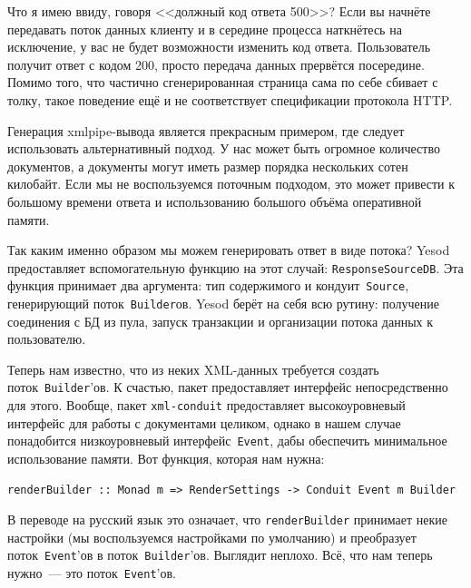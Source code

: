 \begin{remark}
    Что я имею ввиду, говоря <<должный код ответа 500>>? Если вы начнёте
    передавать поток данных клиенту и в середине процесса наткнётесь на
    исключение, у вас не будет возможности изменить код ответа. Пользователь
    получит ответ с кодом 200, просто передача данных прервётся посередине.
    Помимо того, что частично сгенерированная страница сама по себе сбивает с
    толку, такое поведение ещё и не соответствует спецификации протокола HTTP.
\end{remark}

Генерация xmlpipe-вывода является прекрасным примером, где следует использовать
альтернативный подход. У нас может быть огромное количество документов, а
документы могут иметь размер порядка нескольких сотен килобайт. Если мы не
воспользуемся поточным подходом, это может привести к большому времени ответа и
использованию большого объёма оперативной памяти.

Так каким именно образом мы можем генерировать ответ в виде потока? Yesod
предоставляет вспомогательную функцию на этот случай:
\lstinline'ResponseSourceDB'. Эта функция принимает два аргумента: тип
содержимого и кондуит~\lstinline'Source', генерирующий
поток~\lstinline'Builder'ов. Yesod берёт на себя всю рутину: получение
соединения с БД из пула, запуск транзакции и организации потока данных к
пользователю.

Теперь нам известно, что из неких XML-данных требуется создать
поток~\lstinline!Builder!'ов. К счастью, пакет
предоставляет интерфейс непосредственно для этого. Вообще, пакет
\texttt{xml-conduit} предоставляет высокоуровневый интерфейс для работы с
документами целиком, однако в нашем случае понадобится низкоуровневый
интерфейс~\lstinline'Event', дабы обеспечить минимальное использование памяти.
Вот функция, которая нам нужна:
\begin{lstlisting}
renderBuilder :: Monad m => RenderSettings -> Conduit Event m Builder
\end{lstlisting}

В переводе на русский язык это означает, что \lstinline'renderBuilder'
принимает некие настройки (мы воспользуемся настройками по умолчанию) и
преобразует поток~\lstinline!Event!'ов в поток~\lstinline!Builder!'ов. Выглядит
неплохо. Всё, что нам теперь нужно~--- это поток~\lstinline!Event!'ов.

